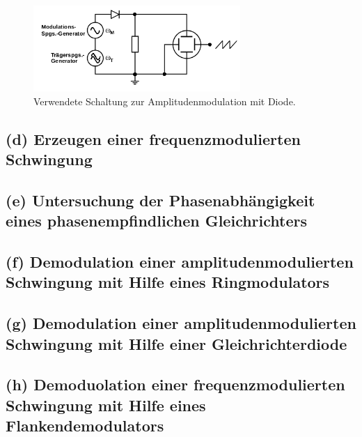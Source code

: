 \begin{figure}
  \centering
  \includegraphics[width=0.7\textwidth]{figures/c_d.png}
  \caption{Verwendete Schaltung zur Amplitudenmodulation mit Diode.\cite{sample}}
  \label{fig:schaltung_c}
\end{figure}


\subsection{(d) Erzeugen einer frequenzmodulierten Schwingung}
\label{subsec:durchfuehrung_d}


\subsection{(e) Untersuchung der Phasenabhängigkeit eines
phasenempfindlichen Gleichrichters}
\label{subsec:durchfuehrung_e}


\subsection{(f) Demodulation einer amplitudenmodulierten Schwingung
mit Hilfe eines Ringmodulators}
\label{subsec:durchfuehrung_f}


\subsection{(g) Demodulation einer amplitudenmodulierten Schwingung
mit Hilfe einer Gleichrichterdiode}
\label{subsec:durchfuehrung_g}


\subsection{(h) Demoduolation einer frequenzmodulierten Schwingung
mit Hilfe eines Flankendemodulators}
\label{subsec:durchfuehrung_h}
